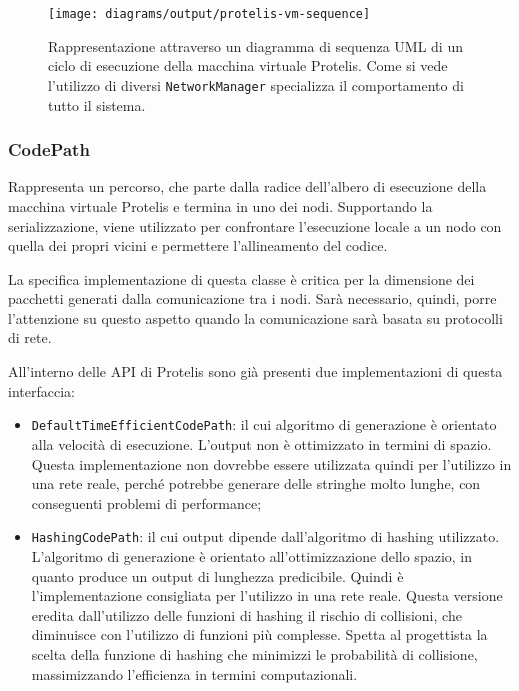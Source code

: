 \begin{figure}
  \centering
  \texttt{[image: diagrams/output/protelis-vm-sequence]}
  \caption{Rappresentazione attraverso un diagramma di sequenza UML di un ciclo
    di esecuzione della macchina virtuale Protelis. Come si vede l'utilizzo di
    diversi \texttt{NetworkManager} specializza il comportamento di tutto il
    sistema.}
    \label{fig:uml-protelisvm-sequence}
\end{figure}


\subsubsection{CodePath}
Rappresenta un percorso, che parte dalla radice dell'albero di esecuzione della
macchina virtuale Protelis e termina in uno dei nodi. Supportando la
serializzazione, viene utilizzato per confrontare l'esecuzione locale a un nodo
con quella dei propri vicini e permettere l'allineamento del codice.

La specifica implementazione di questa classe è critica per la dimensione dei
pacchetti generati dalla comunicazione tra i nodi. Sarà necessario, quindi,
porre l'attenzione su questo aspetto quando la comunicazione sarà basata su
protocolli di rete.

All'interno delle API di Protelis sono già presenti due implementazioni di
questa interfaccia:
\begin{itemize}
\item \texttt{DefaultTimeEfficientCodePath}: il cui algoritmo di generazione è
  orientato alla velocità di esecuzione. L'output non è ottimizzato in termini
  di spazio. Questa implementazione non dovrebbe essere utilizzata quindi per
  l'utilizzo in una rete reale, perché potrebbe generare delle stringhe molto
  lunghe, con conseguenti problemi di performance;
\item \texttt{HashingCodePath}: il cui output dipende dall'algoritmo di hashing
  utilizzato. L'algoritmo di generazione è orientato all'ottimizzazione dello
  spazio, in quanto produce un output di lunghezza predicibile. Quindi è
  l'implementazione consigliata per l'utilizzo in una rete reale. Questa
  versione eredita dall'utilizzo delle funzioni di hashing il rischio di
  collisioni, che diminuisce con l'utilizzo di funzioni più complesse. Spetta al
  progettista la scelta della funzione di hashing che minimizzi le probabilità
  di collisione, massimizzando l'efficienza in termini computazionali.
\end{itemize}

